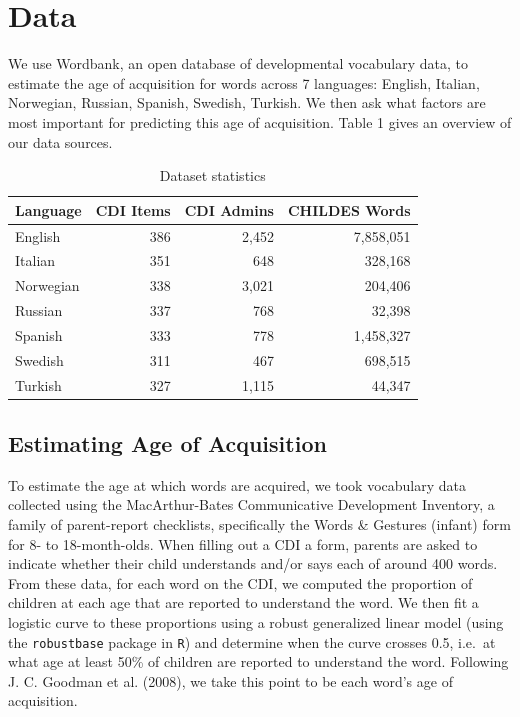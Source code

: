 \documentclass[10pt, letterpaper]{article}
\begin{document}
\section{Data}\label{data}

We use Wordbank, an open database of developmental vocabulary data, to
estimate the age of acquisition for words across 7 languages: English,
Italian, Norwegian, Russian, Spanish, Swedish, Turkish. We then ask what
factors are most important for predicting this age of acquisition. Table
1 gives an overview of our data sources.

\setlength\tabcolsep{3pt}

\begin{table}[ht]
\centering
\begin{tabular}{lrrr}
  \hline
Language & CDI Items & CDI Admins & CHILDES Words \\ 
  \hline
English & 386 & 2,452 & 7,858,051 \\ 
  Italian & 351 & 648 & 328,168 \\ 
  Norwegian & 338 & 3,021 & 204,406 \\ 
  Russian & 337 & 768 & 32,398 \\ 
  Spanish & 333 & 778 & 1,458,327 \\ 
  Swedish & 311 & 467 & 698,515 \\ 
  Turkish & 327 & 1,115 & 44,347 \\ 
   \hline
\end{tabular}
\caption{Dataset statistics} 
\end{table}

\subsection{Estimating Age of
Acquisition}\label{estimating-age-of-acquisition}

To estimate the age at which words are acquired, we took vocabulary data
collected using the MacArthur-Bates Communicative Development Inventory,
a family of parent-report checklists, specifically the Words \& Gestures
(infant) form for 8- to 18-month-olds. When filling out a CDI a form,
parents are asked to indicate whether their child understands and/or
says each of around 400 words. From these data, for each word on the
CDI, we computed the proportion of children at each age that are
reported to understand the word. We then fit a logistic curve to these
proportions using a robust generalized linear model (using the
\texttt{robustbase} package in \texttt{R}) and determine when the curve
crosses 0.5, i.e.~at what age at least 50\% of children are reported to
understand the word. Following J. C. Goodman et al. (2008), we take this
point to be each word's age of acquisition.
\end{document}
